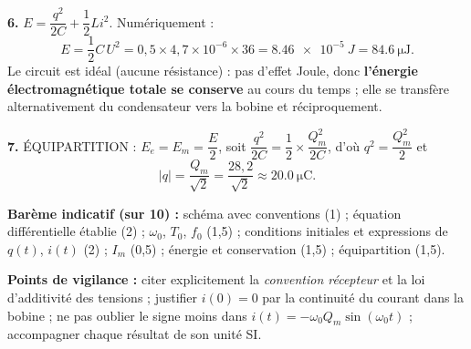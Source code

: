 \documentclass[11pt]{article}
\begin{document}
\begin{corrige}
\textbf{6.} $E = \dfrac{q^2}{2C} + \dfrac{1}{2}Li^2$. Numériquement :
\[
E = \frac{1}{2}C\,U^2 = 0,5 \times 4,7\times10^{-6} \times 36 = \SI{8,46e-5}{J} = \SI{84,6}{\micro\joule}.
\]
Le circuit est idéal (aucune résistance) : pas d'effet Joule, donc \textbf{l'énergie électromagnétique totale se conserve} au cours du temps ; elle se transfère alternativement du condensateur vers la bobine et réciproquement.

\textbf{7.} ÉQUIPARTITION : $E_e = E_m = \dfrac{E}{2}$, soit $\dfrac{q^2}{2C} = \dfrac{1}{2}\times\dfrac{Q_m^2}{2C}$, d'où $q^2 = \dfrac{Q_m^2}{2}$ et
\[
|q| = \frac{Q_m}{\sqrt{2}} = \frac{28,2}{\sqrt{2}} \approx \SI{20,0}{\micro\coulomb}.
\]

\textbf{Barème indicatif (sur 10) :} schéma avec conventions (1) ; équation différentielle établie (2) ; $\omega_0$, $T_0$, $f_0$ (1,5) ; conditions initiales et expressions de $q(t)$, $i(t)$ (2) ; $I_m$ (0,5) ; énergie et conservation (1,5) ; équipartition (1,5).

\textbf{Points de vigilance :} citer explicitement la \emph{convention récepteur} et la loi d'additivité des tensions ; justifier $i(0) = 0$ par la continuité du courant dans la bobine ; ne pas oublier le signe moins dans $i(t) = -\omega_0 Q_m\sin(\omega_0 t)$ ; accompagner chaque résultat de son unité SI.
\end{corrige}
\end{document}
